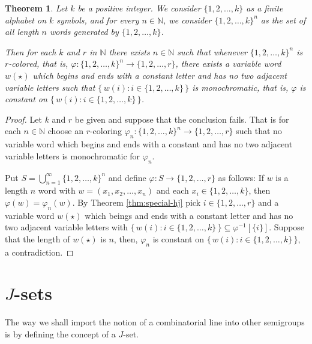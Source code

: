 \documentclass[12pt,showtrims]{memoir}
\theoremstyle{plain}
\newtheorem{thm}{Theorem}[section]
\theoremstyle{definition}
\newcommand{\bbN}{\mathbb{N}}
\begin{document}
\begin{thm}
  \label{thm:finitary-shj}
  Let $k$ be a positive integer.
  We consider $\{1, 2, \ldots, k\}$ as a finite alphabet on $k$ symbols, and for every $n \in \bbN$, we consider $\{1, 2, \ldots, k\}^n$ as the set of all length $n$ words generated by $\{1, 2, \ldots, k\}$.

  Then for each $k$ and $r$ in $\bbN$ there exists $n \in \bbN$ such that whenever $\{1, 2, \ldots, k\}^n$ is $r$-colored, that is, $\varphi \colon \{1, 2, \ldots, k\}^n \to \{1, 2, \ldots, r\}$, there exists a variable word $w(\star)$ which begins and ends with a constant letter and has no two adjacent variable letters such that $\bigl\{\, w(i) : i \in \{1, 2, \ldots, k\} \,\bigr\}$ is monochromatic, that is, $\varphi$ is constant on $\bigl\{\, w(i) : i \in \{1, 2, \ldots, k\} \,\bigr\}$.
\end{thm}
\begin{proof}
  Let $k$ and $r$ be given and suppose that the conclusion fails.
  That is for each $n \in \bbN$ choose an $r$-coloring $\varphi_n \colon \{1, 2, \ldots, k\}^n \to \{1, 2, \ldots, r\}$ such that no variable word which begins and ends with a constant and has no two adjacent variable letters is monochromatic for $\varphi_n$.
  
  Put $S = \bigcup_{n=1}^\infty \{1, 2, \ldots, k\}^n$ and define $\varphi \colon S \to \{1, 2, \ldots, r\}$ as follows: If $w$ is a length $n$ word with $w = (x_1, x_2, \ldots, x_n)$ and each $x_i \in \{1, 2, \ldots, k\}$, then $\varphi(w) = \varphi_n(w)$.
  By Theorem \ref{thm:special-hj} pick $i \in \{1, 2, \ldots, r\}$ and a variable word $w(\star)$ which beings and ends with a constant letter and has no two adjacent variable letters with $\bigl\{\, w(i) : i \in \{1, 2, \ldots, k\} \,\bigr\} \subseteq \varphi^{-1}[\{i\}]$.
  Suppose that the length of $w(\star)$ is $n$, then, $\varphi_n$ is constant on $\bigl\{\, w(i) : i \in \{1, 2, \ldots, k\} \,\bigr\}$, a contradiction. 
\end{proof}

\section{$J$-sets}
The way we shall import the notion of a combinatorial line into other semigroups is by defining the concept of a $J$-set. 
\end{document}
